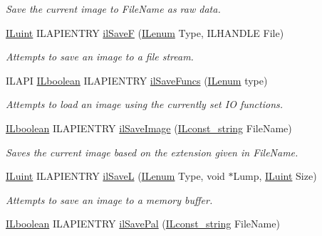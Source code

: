 \begin{DoxyCompactItemize}
\begin{DoxyCompactList}\small\item\em Save the current image to File\+Name as raw data. \end{DoxyCompactList}\item 
\hyperlink{group__il__types_gaff8e86a1072c8d7cfe387fb87c6ed8e1}{I\+Luint} I\+L\+A\+P\+I\+E\+N\+T\+R\+Y \hyperlink{group__file_gaf52fc769ac0af726bd6d0f555a86d1fe}{il\+Save\+F} (\hyperlink{group__il__types_ga62ca73445716183ef42b1f3906a45ed0}{I\+Lenum} Type, I\+L\+H\+A\+N\+D\+L\+E File)
\begin{DoxyCompactList}\small\item\em Attempts to save an image to a file stream. \end{DoxyCompactList}\item 
I\+L\+A\+P\+I \hyperlink{group__il__types_gaa6aa7c95cfdc06b4d8601ef832b7bb0a}{I\+Lboolean} I\+L\+A\+P\+I\+E\+N\+T\+R\+Y \hyperlink{group__file_ga24f497da87676458f3913f7d2a4c0e85}{il\+Save\+Funcs} (\hyperlink{group__il__types_ga62ca73445716183ef42b1f3906a45ed0}{I\+Lenum} type)
\begin{DoxyCompactList}\small\item\em Attempts to load an image using the currently set I\+O functions. \end{DoxyCompactList}\item 
\hyperlink{group__il__types_gaa6aa7c95cfdc06b4d8601ef832b7bb0a}{I\+Lboolean} I\+L\+A\+P\+I\+E\+N\+T\+R\+Y \hyperlink{group__file_ga0e9284b1c258d2e8ae123eb3e330723b}{il\+Save\+Image} (\hyperlink{group__il__types_ga1aa1edc3eb344e14acacb02bade24a5a}{I\+Lconst\+\_\+string} File\+Name)
\begin{DoxyCompactList}\small\item\em Saves the current image based on the extension given in File\+Name. \end{DoxyCompactList}\item 
\hyperlink{group__il__types_gaff8e86a1072c8d7cfe387fb87c6ed8e1}{I\+Luint} I\+L\+A\+P\+I\+E\+N\+T\+R\+Y \hyperlink{group__file_gab9b62589aceecd9c5e4b6ebfe326b181}{il\+Save\+L} (\hyperlink{group__il__types_ga62ca73445716183ef42b1f3906a45ed0}{I\+Lenum} Type, void $\ast$Lump, \hyperlink{group__il__types_gaff8e86a1072c8d7cfe387fb87c6ed8e1}{I\+Luint} Size)
\begin{DoxyCompactList}\small\item\em Attempts to save an image to a memory buffer. \end{DoxyCompactList}\item 
\hypertarget{group__file_gafa4316e5d7b9a35bf872e7ddd2a8bb64}{\hyperlink{group__il__types_gaa6aa7c95cfdc06b4d8601ef832b7bb0a}{I\+Lboolean} I\+L\+A\+P\+I\+E\+N\+T\+R\+Y \hyperlink{group__file_gafa4316e5d7b9a35bf872e7ddd2a8bb64}{il\+Save\+Pal} (\hyperlink{group__il__types_ga1aa1edc3eb344e14acacb02bade24a5a}{I\+Lconst\+\_\+string} File\+Name)}\label{group__file_gafa4316e5d7b9a35bf872e7ddd2a8bb64}


\end{DoxyCompactItemize}
